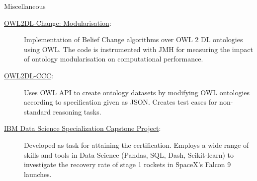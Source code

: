 \begin{rSection}{Miscellaneous}
\begin{description}[nosep]
{            \begin{description}
                \item[]
                \item[\href{https://gitlab.com/rfguimaraes/owl-change}{OWL2DL-Change: Modularisation}:] Implementation of Belief Change algorithms over OWL 2 DL ontologies using OWL. The code is instrumented with JMH for measuring the impact of ontology modularisation on computational performance.
                \item[\href{https://gitlab.com/rfguimaraes/owl2dl-ccc}{OWL2DL-CCC}:] Uses OWL API to create ontology datasets by modifying OWL ontologies according to specification given as JSON. Creates test cases for non-standard reasoning tasks.
                \item[\href{https://github.com/rfguimaraes/DataScienceCapstone}{IBM Data Science Specialization Capstone Project}:] Developed as task for attaining the certification. Employs a wide range of skills and tools in Data Science (Pandas, SQL, Dash, Scikit-learn) to investigate the recovery rate of stage 1 rockets in SpaceX's Falcon 9 launches.
            \end{description}
        }
    \end{description} 
\end{rSection}
